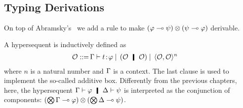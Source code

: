 \subsection{Typing Derivations}

On top of Abramsky's~\citep{abramsky1993computational} we add a rule to
make $(\varphi\multimap\psi)\otimes(\psi\multimap\varphi)$ derivable.

A hypersequent is inductively defined as
\begin{align*}
 \hypert ::=\, &\G\tr\tj{t}{\phi}
 \mid\, (\hypert\hmid \hypert)
 \mid\, \lpair{\hypert,\hypert}^n
\end{align*}
where $n$ is a natural number and $\Gamma$ is a context. 
The last clause is used to implement the so-called additive box.
Differently from the previous chapters,
here, the hypersequent $\G\tr\phi\hmid \D\tr\psi$ is interpreted as the
conjunction of components:
$(\bigotimes\Gamma\multimap\varphi)\otimes (\bigotimes\Delta\multimap\psi)$.

